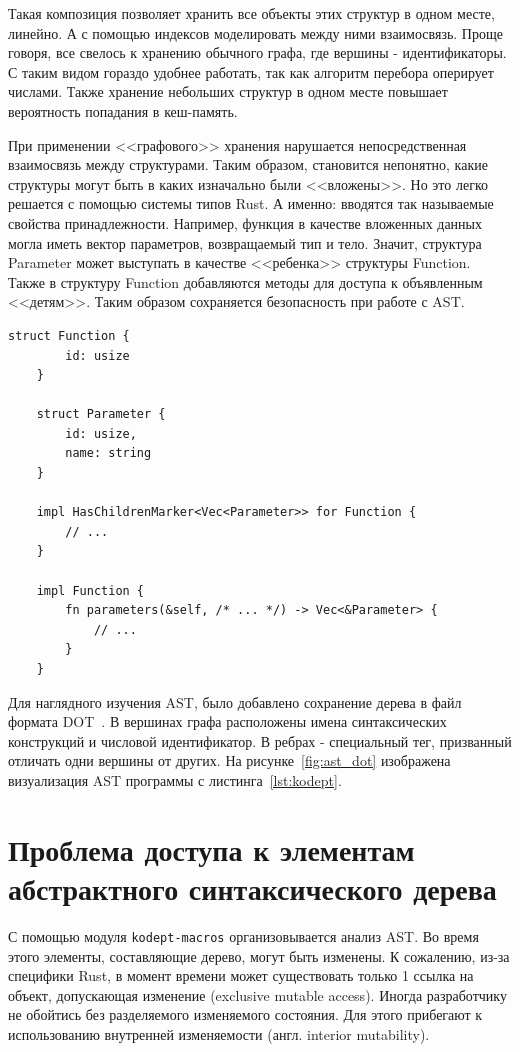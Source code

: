 Такая композиция позволяет хранить все объекты этих структур в одном месте, линейно.
А с помощью индексов моделировать между ними взаимосвязь.
Проще говоря, все свелось к хранению обычного графа, где вершины - идентификаторы.
С таким видом гораздо удобнее работать, так как алгоритм перебора оперирует числами.
Также хранение небольших структур в одном месте повышает вероятность попадания в кеш-память.

При применении <<графового>> хранения нарушается непосредственная взаимосвязь между структурами.
Таким образом, становится непонятно, какие структуры могут быть в каких изначально были <<вложены>>.
Но это легко решается с помощью системы типов Rust.
А именно: вводятся так называемые свойства принадлежности.
Например, функция в качестве вложенных данных могла иметь вектор параметров, возвращаемый тип и тело.
Значит, структура Parameter может выступать в качестве <<ребенка>> структуры Function.
Также в структуру Function добавляются методы для доступа к объявленным <<детям>>.
Таким образом сохраняется безопасность при работе с AST.

\begin{lstlisting}[label=lst:node, caption={Упрощенное представление структур после всех доработок на языке Rust}]
    struct Function {
        id: usize
    }

    struct Parameter {
        id: usize,
        name: string
    }

    impl HasChildrenMarker<Vec<Parameter>> for Function {
        // ...
    }

    impl Function {
        fn parameters(&self, /* ... */) -> Vec<&Parameter> {
            // ...
        }
    }
\end{lstlisting}

Для наглядного изучения AST, было добавлено сохранение дерева в файл формата DOT~\cite{Dot}.
В вершинах графа расположены имена синтаксических конструкций и числовой идентификатор.
В ребрах - специальный тег, призванный отличать одни вершины от других.
На рисунке~\ref{fig:ast_dot} изображена визуализация AST программы с листинга~\ref{lst:kodept}.

\section{Проблема доступа к элементам абстрактного синтаксического дерева}
\label{sec:ast_access}

С помощью модуля \lstinline{kodept-macros} организовывается анализ AST.
Во время этого элементы, составляющие дерево, могут быть изменены.
К сожалению, из-за специфики Rust, в момент времени может существовать только 1 ссылка на объект, допускающая изменение (exclusive mutable access).
Иногда разработчику не обойтись без разделяемого изменяемого состояния.
Для этого прибегают к использованию внутренней изменяемости (англ. interior mutability).


